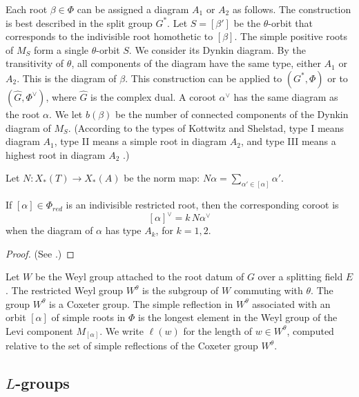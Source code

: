 Each root $\beta\in\Phi$ can be assigned a diagram $A_1$ or $A_2$ as
follows.  The construction is best described in the split group $G^*$.
Let $S=[\beta']$ be the $\theta$-orbit that corresponds to the
indivisible root homothetic to $[\beta]$.  The simple positive roots
of $M_S$ form a single $\theta$-orbit $S$.  We consider its Dynkin
diagram.  By the transitivity of $\theta$, all components of the
diagram have the same type, either $A_1$ or $A_2$.  This is the
diagram of $\beta$.  This construction can be applied to $(G^*,\Phi)$
or to $(\hat G,\Phi^\vee)$, where $\hat G$ is the complex dual.  A
coroot $\alpha^\vee$ has the same diagram as the root $\alpha$.  We let
$b(\beta)$ be the number of connected components of the Dynkin
diagram of $M_S$.  (According to the types of Kottwitz and Shelstad, type I
means diagram $A_1$, type II means a simple root in diagram $A_2$, and
type III means a highest root in diagram $A_2$
\cite{kottwitz1999foundations}.)

Let $N:X_*(T)\to X_*(A)$ be the norm map: 
$N\alpha = \sum_{\alpha'\in  [\alpha]} \alpha'$.

\begin{lemma}\label{lemma:norm}
 If $[\alpha]\in\Phi_{red}$ is an indivisible restricted root, then
  the corresponding coroot is
\begin{equation}\label{eqn:norm}
[\alpha]^\vee = k\, N\alpha^\vee
\end{equation}
when the diagram of $\alpha$ has type $A_k$, for $k=1,2$.
\end{lemma}

\begin{proof}
(See \cite[1.3.9]{kottwitz1999foundations}.)
\end{proof}

Let $W$ be the Weyl group attached to the root datum of $G$ over a
splitting field $E$.  The restricted Weyl group $W^\theta$ is the
subgroup of $W$ commuting with $\theta$.  The group $W^\theta$ is a
Coxeter group.  The simple reflection in $W^\theta$ associated with an
orbit $[\alpha]$ of simple roots in $\Phi$ is the longest element in
the Weyl group of the Levi component $M_{[\alpha]}$.  We write
$\ell(w)$ for the length of $w\in W^\theta$, computed relative to the
set of simple reflections of the Coxeter group $W^\theta$.

\subsection{$L$-groups}\label{sec:L}

